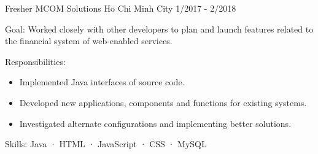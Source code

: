   \cventry
    {Fresher} %
    {MCOM Solutions} %
    {Ho Chi Minh City} %
    {1/2017 - 2/2018} %
    {
      \begin{cvitems} %
        \item {Goal: Worked closely with other developers to plan and launch features related to the financial system of web-enabled services.}
        \item {Responsibilities: }
        {
            \begin{itemize} %
                \item {Implemented Java interfaces of source code.}
                \item {Developed new applications, components and functions for existing systems.}
                \item {Investigated alternate configurations and implementing better solutions.}
            \end{itemize}
        }
        \item {Skills: Java · HTML · JavaScript · CSS · MySQL}
      \end{cvitems}
    }
